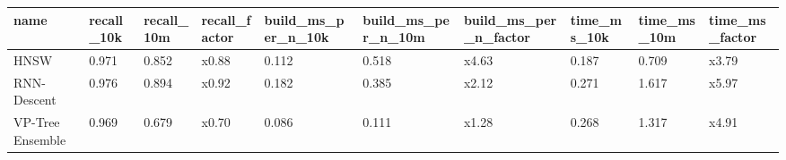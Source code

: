 \begin{tabular}{llllllllll}
\toprule
name & recall_10k & recall_10m & recall_factor & build_ms_per_n_10k & build_ms_per_n_10m & build_ms_per_n_factor & time_ms_10k & time_ms_10m & time_ms_factor \\
\midrule
HNSW & 0.971 & 0.852 & x0.88 & 0.112 & 0.518 & x4.63 & 0.187 & 0.709 & x3.79 \\
RNN-Descent & 0.976 & 0.894 & x0.92 & 0.182 & 0.385 & x2.12 & 0.271 & 1.617 & x5.97 \\
VP-Tree Ensemble & 0.969 & 0.679 & x0.70 & 0.086 & 0.111 & x1.28 & 0.268 & 1.317 & x4.91 \\
\bottomrule
\end{tabular}
